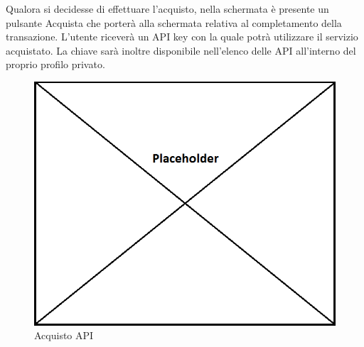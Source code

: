 Qualora si decidesse di effettuare l'acquisto, nella schermata è presente un pulsante Acquista che porterà alla schermata relativa al completamento della transazione. L'utente riceverà un API key con la quale potrà utilizzare il servizio acquistato. La chiave sarà inoltre disponibile nell'elenco delle API all'interno del proprio profilo privato.

\label{Acquisto API}
\begin{figure}[H]
	\centering
	\includegraphics[scale=0.45]{img/placeholder.png}
	\caption{Acquisto API}
\end{figure}